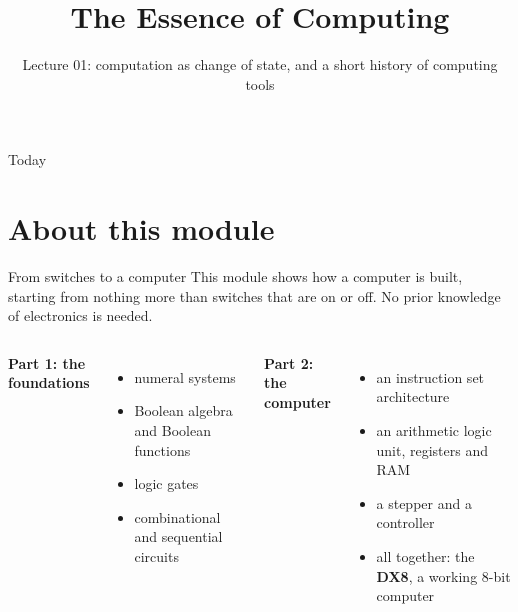 \documentclass[10pt]{wosm-slides}
\title[Lecture 01 \textperiodcentered\ The Essence of Computing]{The Essence of Computing}
\subtitle{Lecture 01: computation as change of state, and a short history of computing tools}
\begin{document}
\maketitle

\begin{frame}{Today}
  \tableofcontents
\end{frame}

\section{About this module}

\begin{frame}{From switches to a computer}
  This module shows how a computer is built, starting from nothing more than
  switches that are on or off. No prior knowledge of electronics is needed.

  \medskip
  \begin{columns}[T, totalwidth=\textwidth]
      \textbf{Part 1: the foundations}
      \begin{itemize}
        \item numeral systems
        \item Boolean algebra and Boolean functions
        \item logic gates
        \item combinational and sequential circuits
      \end{itemize}
      \textbf{Part 2: the computer}
      \begin{itemize}
        \item an instruction set architecture
        \item an arithmetic logic unit, registers and RAM
        \item a stepper and a controller
        \item all together: the \textbf{DX8}, a working 8-bit computer
      \end{itemize}
  \end{columns}

  \medskip
\end{frame}
\end{document}
